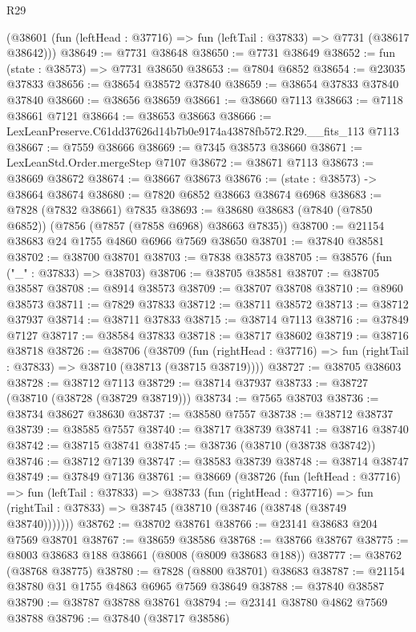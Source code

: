 \begin{lexlean}{R29}
\begin{coremodule}
    (@38601 (fun (leftHead : @37716) => fun (leftTail : @37833) => @7731 (@38617 @38642)))
@38649 := @7731 @38648
@38650 := @7731 @38649
@38652 := fun (state : @38573) => @7731 @38650
@38653 := @7804 @6852
@38654 := @23035 @37833
@38656 := @38654 @38572 @37840
@38659 := @38654 @37833 @37840 @37840
@38660 := @38656 @38659
@38661 := @38660 @7113
@38663 := @7118 @38661 @7121
@38664 := @38653 @38663
@38666 := LexLeanPreserve.C61dd37626d14b7b0e9174a43878fb572.R29.__fits_113 @7113
@38667 := @7559 @38666
@38669 := @7345 @38573 @38660
@38671 := LexLeanStd.Order.mergeStep @7107
@38672 := @38671 @7113
@38673 := @38669 @38672
@38674 := @38667 @38673
@38676 := (state : @38573) -> @38664 @38674
@38680 := @7820 @6852 @38663 @38674 @6968
@38683 := @7828 (@7832 @38661) @7835
@38693 := @38680 @38683 (@7840 (@7850 @6852)) (@7856 (@7857 (@7858 @6968) @38663 @7835))
@38700 := @21154 @38683 @24 @1755 @4860 @6966 @7569 @38650
@38701 := @37840 @38581
@38702 := @38700 @38701
@38703 := @7838 @38573
@38705 := @38576 (fun ("_" : @37833) => @38703)
@38706 := @38705 @38581
@38707 := @38705 @38587
@38708 := @8914 @38573
@38709 := @38707 @38708
@38710 := @8960 @38573
@38711 := @7829 @37833
@38712 := @38711 @38572
@38713 := @38712 @37937
@38714 := @38711 @37833
@38715 := @38714 @7113
@38716 := @37849 @7127
@38717 := @38584 @37833
@38718 := @38717 @38602
@38719 := @38716 @38718
@38726 := @38706
    (@38709
      (fun (rightHead : @37716) => fun (rightTail : @37833) => @38710 (@38713 (@38715 @38719))))
@38727 := @38705 @38603
@38728 := @38712 @7113
@38729 := @38714 @37937
@38733 := @38727 (@38710 (@38728 (@38729 @38719)))
@38734 := @7565 @38703
@38736 := @38734 @38627 @38630
@38737 := @38580 @7557
@38738 := @38712 @38737
@38739 := @38585 @7557
@38740 := @38717 @38739
@38741 := @38716 @38740
@38742 := @38715 @38741
@38745 := @38736 (@38710 (@38738 @38742))
@38746 := @38712 @7139
@38747 := @38583 @38739
@38748 := @38714 @38747
@38749 := @37849 @7136
@38761 := @38669
    (@38726
      (fun (leftHead : @37716) =>
      fun (leftTail : @37833) =>
      @38733
        (fun (rightHead : @37716) =>
        fun (rightTail : @37833) => @38745 (@38710 (@38746 (@38748 (@38749 @38740)))))))
@38762 := @38702 @38761
@38766 := @23141 @38683 @204 @7569 @38701
@38767 := @38659 @38586
@38768 := @38766 @38767
@38775 := @8003 @38683 @188 @38661 (@8008 (@8009 @38683 @188))
@38777 := @38762 (@38768 @38775)
@38780 := @7828 (@8800 @38701) @38683
@38787 := @21154 @38780 @31 @1755 @4863 @6965 @7569 @38649
@38788 := @37840 @38587
@38790 := @38787 @38788 @38761
@38794 := @23141 @38780 @4862 @7569 @38788
@38796 := @37840 (@38717 @38586)

\end{coremodule}
\end{lexlean}
